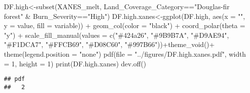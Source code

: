 \documentclass[
]{article}
\newenvironment{Shaded}{\begin{snugshade}}{\end{snugshade}}
\newcommand{\AttributeTok}[1]{\textcolor[rgb]{0.77,0.63,0.00}{#1}}
\newcommand{\DecValTok}[1]{\textcolor[rgb]{0.00,0.00,0.81}{#1}}
\newcommand{\FunctionTok}[1]{\textcolor[rgb]{0.00,0.00,0.00}{#1}}
\newcommand{\NormalTok}[1]{#1}
\newcommand{\OtherTok}[1]{\textcolor[rgb]{0.56,0.35,0.01}{#1}}
\newcommand{\SpecialCharTok}[1]{\textcolor[rgb]{0.00,0.00,0.00}{#1}}
\newcommand{\StringTok}[1]{\textcolor[rgb]{0.31,0.60,0.02}{#1}}
\begin{document}
\begin{Shaded}
\begin{Highlighting}[]
\NormalTok{DF.high}\OtherTok{\textless{}{-}}\FunctionTok{subset}\NormalTok{(XANES\_melt, Land\_Coverage\_Category}\SpecialCharTok{==}\StringTok{"Douglas{-}fir forest"} \SpecialCharTok{\&}\NormalTok{ Burn\_Severity}\SpecialCharTok{==}\StringTok{"High"}\NormalTok{)}
\NormalTok{DF.high.xanes}\OtherTok{\textless{}{-}}\FunctionTok{ggplot}\NormalTok{(DF.high, }\FunctionTok{aes}\NormalTok{(}\AttributeTok{x =} \StringTok{""}\NormalTok{, }\AttributeTok{y =}\NormalTok{ value, }\AttributeTok{fill =}\NormalTok{ variable)) }\SpecialCharTok{+}
    \FunctionTok{geom\_col}\NormalTok{(}\AttributeTok{color =} \StringTok{"black"}\NormalTok{) }\SpecialCharTok{+}
    \FunctionTok{coord\_polar}\NormalTok{(}\AttributeTok{theta =} \StringTok{"y"}\NormalTok{) }\SpecialCharTok{+} \FunctionTok{scale\_fill\_manual}\NormalTok{(}\AttributeTok{values =} \FunctionTok{c}\NormalTok{(}\StringTok{"\#424a26"}\NormalTok{, }\StringTok{"\#9B9B7A"}\NormalTok{, }\StringTok{"\#D9AE94"}\NormalTok{, }\StringTok{"\#F1DCA7"}\NormalTok{, }\StringTok{"\#FFCB69"}\NormalTok{, }\StringTok{"\#D08C60"}\NormalTok{, }\StringTok{"\#997B66"}\NormalTok{))}\SpecialCharTok{+}\FunctionTok{theme\_void}\NormalTok{()}\SpecialCharTok{+}
    \FunctionTok{theme}\NormalTok{(}\AttributeTok{legend.position =} \StringTok{"none"}\NormalTok{)}
\FunctionTok{pdf}\NormalTok{(}\AttributeTok{file =} \StringTok{"../figures/DF.high.xanes.pdf"}\NormalTok{, }\AttributeTok{width =} \DecValTok{1}\NormalTok{, }\AttributeTok{height =} \DecValTok{1}\NormalTok{) }
\FunctionTok{print}\NormalTok{(DF.high.xanes)}
\FunctionTok{dev.off}\NormalTok{()}
\end{Highlighting}
\end{Shaded}

\begin{verbatim}
## pdf 
##   2
\end{verbatim}
\end{document}
